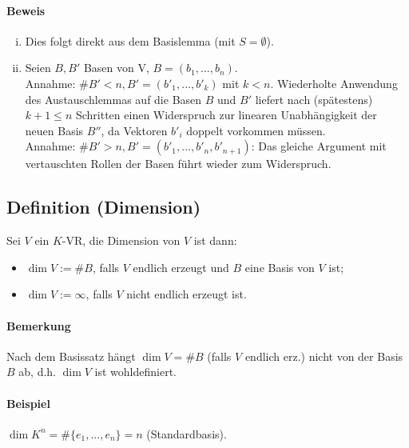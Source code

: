 \paragraph{Beweis}
    \begin{enumerate}[(i)]
        \item  Dies folgt direkt aus dem Basislemma (mit $S=\emptyset$).
        \item Seien $B,B'$ Basen von V, $B = (b_1,...,b_n)$.\\
        Annahme: $\#B' < n, B' = (b'_1,...,b'_k)$ mit $k < n$. Wiederholte Anwendung des Austauschlemmas auf die Basen $B$ und $B'$ liefert nach (spätestens) $k+1\leq n$ Schritten einen Widerspruch zur linearen Unabhängigkeit der neuen Basis $B''$, da Vektoren $b'_i$ doppelt vorkommen müssen.\\
        Annahme: $\#B' > n, B' = (b'_1,...,b'_n,b'_{n+1})$: Das gleiche Argument mit vertauschten Rollen der Basen führt wieder zum Widerspruch.
     \end{enumerate}

\subsection{Definition (Dimension)}
    \begin{Definition}[Dimension]
    	Sei $V$ ein $K$-VR, die Dimension von $ V $ ist dann:
    \begin{itemize}
        \item $\dim V:= \#B$, falls $ V $ endlich erzeugt und $B$ eine Basis von $V$ ist;
        \item $\dim V:= \infty$, falls $V$ nicht endlich erzeugt ist.
    \end{itemize}
    \end{Definition}
    
\paragraph{Bemerkung}
    Nach dem Basissatz hängt $\dim V = \#B$ (falls $V$ endlich erz.) nicht von der Basis $B$ ab, d.h. $\dim V$ ist wohldefiniert.
    
\paragraph{Beispiel}
    $\dim K^n = \#\{e_1,...,e_n\} = n$ (Standardbasis).

